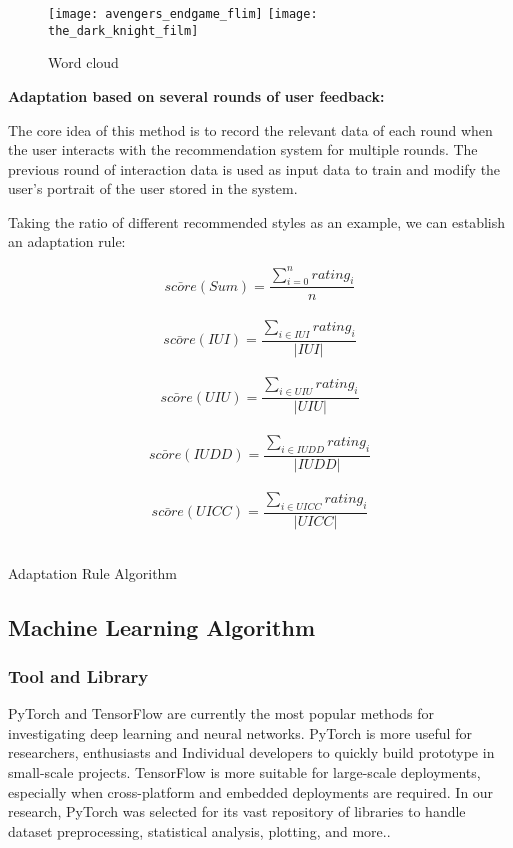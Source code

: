 \begin{figure}[h]
\caption{Word cloud}
\centering
\texttt{[image: avengers\_endgame\_flim]}
\texttt{[image: the\_dark\_knight\_film]}
\end{figure}
\textbf{Adaptation based on several rounds of user feedback:} \\
\par The core idea of this method is to record the relevant data of each round when the user interacts with the recommendation system for multiple rounds. The previous round of interaction data is used as input data to train and modify the user's portrait of the user stored in the system.
\par Taking the ratio of different recommended styles as an example, we can establish an adaptation rule:

\begin{algorithm}[H]
\SetAlgoLined
{}
  \[ \bar{score}(Sum) = \frac{\sum_{i=0}^{n}rating_{i}}{n} \] \
  \[ \bar{score}(IUI) = \frac{\sum_{i\in IUI}rating_{i}}{|IUI|} \] \
  \[ \bar{score}(UIU) = \frac{\sum_{i\in UIU}rating_{i}}{|UIU|} \] \
  \[ \bar{score}(IUDD) = \frac{\sum_{i\in IUDD}rating_{i}}{|IUDD|} \] \
  \[ \bar{score}(UICC) = \frac{\sum_{i\in UICC}rating_{i}}{|UICC|} \] \
 \While{\[ count_{sum}==10 \]}{
  \[ count_{IUI}  \mathrel{+}= func_{propotion}(\bar{score}(IUI)-\bar{score}(sum)) \] \
  \[ count_{UIU}  \mathrel{+}= func_{propotion}(\bar{score}(UIU)-\bar{score}(sum)) \] \
  \[ count_{IUDD}  \mathrel{+}= func_{propotion}(\bar{score}(IUDD)-\bar{score}(sum)) \] \
  \[ count_{UICC}  \mathrel{+}= func_{propotion}(\bar{score}(UICC)-\bar{score}(sum)) \] \
  \If{\[ count_{x} < 0 \]}{
    \[ count_{x} = 0 \] \
   }
 }
 \caption{Adaptation Rule Algorithm}
\end{algorithm}

\subsection{Machine Learning Algorithm}

\subsubsection{Tool and Library}
PyTorch\cite{ketkar2017introduction} and TensorFlow\cite{abadi2016tensorflow} are currently the most popular methods for investigating deep learning and neural networks. PyTorch is more useful for researchers, enthusiasts and Individual developers to quickly build prototype in small-scale projects. TensorFlow is more suitable for large-scale deployments, especially when cross-platform and embedded deployments are required. In our research, PyTorch was selected for its vast repository of libraries to handle dataset preprocessing, statistical analysis, plotting, and more.\cite{paszke2019pytorch}.

